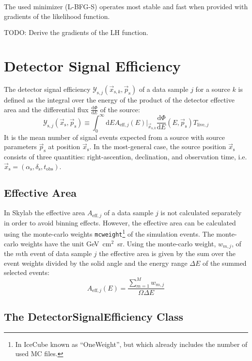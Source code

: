 \documentclass{article}
\newcommand{\code}[1]{\texttt{#1}}
\newcommand{\ps}{\vec{p}_{\mathrm{s}}}
\newcommand{\xs}{\vec{x}_{\mathrm{s}}}
\newcommand{\xsk}{\vec{x}_{\mathrm{s},k}}
\begin{document}
The used minimizer (L-BFG-S) operates most stable and fast when provided with
gradients of the likelihood function.

TODO: Derive the gradients of the LH function.

\section{Detector Signal Efficiency}

The detector signal efficiency $\mathcal{Y}_{\mathrm{s},j}(\vec{x}_{\mathrm{s},k},\ps)$
of a data sample $j$ for a source $k$ is defined as the integral over the energy
of the product of the detector effective area and the differential flux
$\frac{\mathrm{d}\Phi}{\mathrm{d}E}$ of the source:
\begin{equation}
 \mathcal{Y}_{\mathrm{s},j}(\xs,\ps) \equiv \int_0^\infty \mathrm{d}E A_{\mathrm{eff},j}(E)|_{\xsk} \frac{\mathrm{d}\Phi}{\mathrm{d}E}(E,\ps) T_{\mathrm{live},j}
\label{eq:Ysj}
\end{equation}
It is the mean number of signal events expected from a source with source
parameters $\ps$ at position $\xs$. In the most-general case, the source position $\xs$
consists of three quantities: right-ascention, declination, and observation time,
i.e. $\xs = (\alpha_{\mathrm{s}},\delta_{\mathrm{s}},t_{\mathrm{obs}})$.

\subsection{Effective Area}

In Skylab the effective area $A_{\mathrm{eff},j}$ of a data sample $j$ is not
calculated separately in order to avoid binning effects. However, the effective
area can be calculated using the monte-carlo weights \code{mcweight}\footnote{In IceCube
known as ``OneWeight'', but which already includes the number of used MC files.}
of the simulation events.
The monte-carlo weights have the unit GeV~cm$^2$~sr.
Using the monte-carlo weight, $w_{m,j}$, of the $m$th event of data sample $j$
the effective area is given by the sum over the event weights divided by the
solid angle and the energy range $\Delta E$ of the summed selected events:
\begin{equation}
 A_{\mathrm{eff},j}(E) = \frac{\sum_{m=1}^{M} w_{m,j}}{\Omega \Delta E}
\end{equation}


\subsection{The DetectorSignalEfficiency Class}
\end{document}

